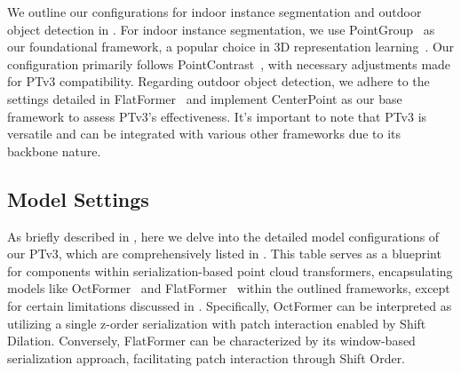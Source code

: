 We outline our configurations for indoor instance segmentation and outdoor object detection in . For indoor instance segmentation, we use PointGroup~\cite{jiang2020pointgroup} as our foundational framework, a popular choice in 3D representation learning~\cite{xie2020pointcontrast, hou2021exploring, wu2023masked, wu2023ppt}. Our configuration primarily follows PointContrast~\cite{xie2020pointcontrast}, with necessary adjustments made for PTv3 compatibility. Regarding outdoor object detection, we adhere to the settings detailed in FlatFormer~\cite{liu2023flatformer} and implement CenterPoint as our base framework to assess PTv3's effectiveness. It's important to note that PTv3 is versatile and can be integrated with various other frameworks due to its backbone nature.

\begin{table}[!t]
    \begin{minipage}{0.48\textwidth}
    \centering
        
        \vspace{-3mm}
        \caption{\textbf{Nomalization layer.} }\label{tab:appendix_ablation_normalization}
        \vspace{2mm}
    \end{minipage}
    \begin{minipage}{0.48\textwidth}
    \centering
        
        \vspace{-3mm}
        \caption{\textbf{Block structure.} }\label{tab:appendix_ablation_block}
        \vspace{-6mm}
    \end{minipage}
\end{table}

\subsection{Model Settings}
As briefly described in , here we delve into the detailed model configurations of our PTv3, which are comprehensively listed in . This table serves as a blueprint for components within serialization-based point cloud transformers, encapsulating models like OctFormer~\cite{Wang2023OctFormer} and FlatFormer~\cite{liu2023flatformer} within the outlined frameworks, except for certain limitations discussed in . Specifically, OctFormer can be interpreted as utilizing a single z-order serialization with patch interaction enabled by Shift Dilation. Conversely, FlatFormer can be characterized by its window-based serialization approach, facilitating patch interaction through Shift Order.

